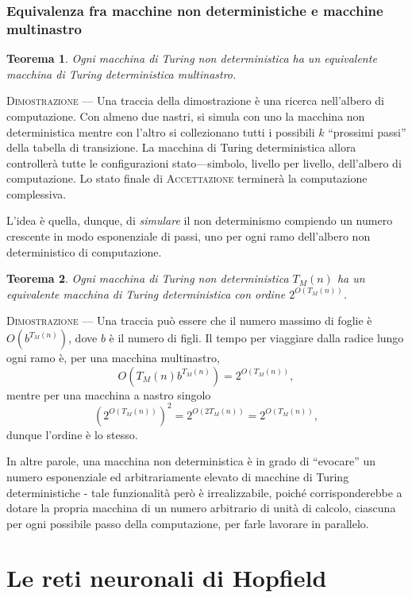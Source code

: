 \documentclass[10pt]{book}
\newtheorem{thm}{Teorema}
\begin{document}
\subsection{Equivalenza fra macchine non deterministiche e macchine multinastro}

\begin{thm}
    Ogni macchina di Turing non deterministica ha un equivalente macchina di
    Turing deterministica multinastro.
\end{thm}

\textsc{Dimostrazione} \---- Una traccia della dimostrazione è una ricerca
nell'albero di computazione. Con almeno due nastri, si simula con uno la
macchina non deterministica mentre con l'altro si collezionano tutti i
possibili $k$ ``prossimi passi'' della tabella di transizione. La macchina di
Turing deterministica allora controllerà tutte le configurazioni
stato\----simbolo, livello per livello, dell'albero di computazione. Lo stato
finale di \textsc{Accettazione} terminerà la computazione complessiva.

L'idea è quella, dunque, di \emph{simulare} il non determinismo compiendo un
numero crescente in modo esponenziale di passi, uno per ogni ramo dell'albero
non deterministico di computazione.

\begin{thm}
    Ogni macchina di Turing non deterministica $T_M(n)$ ha un equivalente
    macchina di Turing deterministica con ordine $2^{O(T_M(n))}$.
\end{thm}

\textsc{Dimostrazione} \---- Una traccia può essere che il numero massimo di
foglie è $O(b^{T_M(n)})$, dove $b$ è il numero di figli. Il tempo per viaggiare
dalla radice lungo ogni ramo è, per una macchina multinastro,
$$O(T_M(n)b^{T_M(n)}) = 2^{O(T_M(n))},$$ mentre per una macchina a nastro
singolo $$(2^{O(T_M(n))})^2 = 2^{O(2T_M(n))} = 2^{O(T_M(n))},$$ dunque l'ordine
è lo stesso.

In altre parole, una macchina non deterministica è in grado di ``evocare'' un
numero esponenziale ed arbitrariamente elevato di macchine di Turing
deterministiche \-- tale funzionalità però è irrealizzabile, poiché
corrisponderebbe a dotare la propria macchina di un numero arbitrario di unità
di calcolo, ciascuna per ogni possibile passo della computazione, per farle
lavorare in parallelo.


\chapter{Le reti neuronali di Hopfield}
\end{document}
